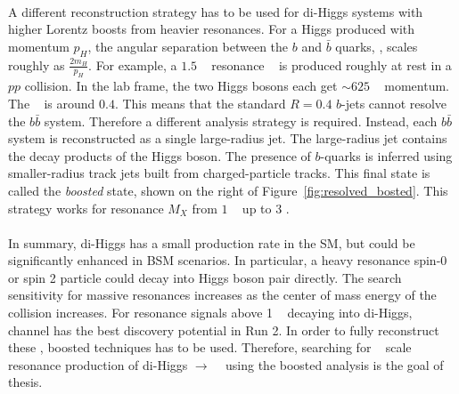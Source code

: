 \paragraph{}
A different reconstruction strategy has to be used for di-Higgs systems with higher Lorentz boosts from heavier resonances.
For a Higgs produced with momentum $p_{H}$, the angular separation between the $b$ and $\bar{b}$ quarks, \drbb, scales roughly as $\frac{2m_H}{p_{H}}$. 
For example, a $1.5$ \TeV~ resonance \Grav~ is produced roughly at rest in a $pp$ collision. 
In the lab frame, the two Higgs bosons each get $\sim 625$ \GeV~ momentum. 
The \drbb~ is around $0.4$.
This means that the standard $R=0.4$ $b$-jets cannot resolve the $b\bar{b}$ system.
Therefore a different analysis strategy is required.
Instead, each $b\bar{b}$ system is reconstructed as a single large-radius jet.
The large-radius jet contains the decay products of the Higgs boson.
The presence of $b$-quarks is inferred using smaller-radius track jets built from charged-particle tracks.
This final state is called the \textit{boosted} state, shown on the right of Figure~\ref{fig:resolved_bosted}.
This strategy works for resonance $M_X$ from $1$ \GeV~ up to $3$ \TeV.


\paragraph{}
In summary, di-Higgs has a small production rate in the SM, but could be significantly enhanced in BSM scenarios. In particular, a heavy resonance spin-0 or spin 2 particle could decay into Higgs boson pair directly. The search sensitivity for massive resonances increases as the center of mass energy of the collision increases. For resonance signals above 1 \TeV~ decaying into di-Higgs, \bbbb~ channel has the best discovery potential in Run 2. In order to fully reconstruct these \Xtohhb, boosted techniques has to be used. Therefore, searching for \TeV~ scale resonance production of di-Higgs $\to$ \bbbb~ using the boosted analysis is the goal of thesis.


